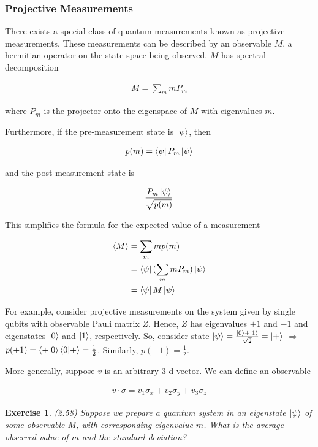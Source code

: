 \documentclass[11pt]{article}
\newcommand\0{\mathbf{0}}
\newcommand\<{\langle}
\renewcommand\>{\rangle}
\renewcommand\implies{\Rightarrow}
\newtheorem{exercise}[theorem]{Exercise}
\begin{document}
\subsubsection{Projective Measurements}

There exists a special class of quantum measurements known as projective measurements. These measurements can be described by an observable $M$, a hermitian operator on the state space being observed. $M$ has spectral decomposition

\begin{align*}
M = \sum_m m P_m	
\end{align*}

where $P_m$ is the projector onto the eigenspace of $M$ with eigenvalues $m$. 

Furthermore, if the pre-measurement state is $\ket{\psi}$, then 

\begin{align*}
p(m) = 	\bra{\psi} P_m \ket{\psi}
\end{align*}

and the post-measurement state is 

\begin{align*}
	\frac{P_m \ket{\psi}}{\sqrt{p(m)}}
\end{align*}

This simplifies the formula for the expected value of a measurement

\begin{align*}
\langle M \rangle &= \sum_m m p(m) \\
&= \bra{\psi} (\sum_m m P_m)  \ket{\psi} \\
&= 	\bra{\psi} M \ket{\psi}
\end{align*}

For example, consider projective measurements on the system given by single qubits with observable Pauli matrix $Z$. Hence, $Z$ has eigenvalues $+1$ and $-1$ and eigenstates $\ket{0}$ and $\ket{1}$, respectively. So, consider state $\ket{\psi} = \frac{\ket{0} + \ket{1}}{\sqrt{2}}= \ket{+}$ $\implies$ $p(+1) = \bra{+}\ket{0}\bra{0}\ket{+} = \frac{1}{2}$. Similarly, $p(-1) = \frac{1}{2}$. 

More generally, suppose $v$ is an arbitrary 3-d vector. We can define an observable

\begin{align*}
v \cdot \sigma = v_1\sigma_x + v_2 \sigma_y + v_3\sigma_z
\end{align*}

\begin{exercise}
	(2.58) Suppose we prepare a quantum system in an eigenstate $\ket{\psi}$ of some observable $M$, with corresponding eigenvalue $m$. What is the average observed value of $m$ and the standard deviation?
	
	
\end{exercise} 
\end{document}
